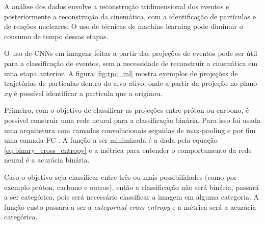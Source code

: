 \documentclass[a4paper,12pt,oneside]{book}
\begin{document}
\begin{appendices}
\par A análise dos dados envolve a reconstrução tridimensional dos eventos e posteriormente a reconstrução da cinemática, com a identificação de partículas e de reações nucleares. O uso de técnicas de machine learning pode diminuir o consumo de tempo dessas etapas.

\par O uso de CNNs em imagens feitas a partir das projeções de eventos pode ser útil para a classificação de eventos, sem a necessidade de reconstruir a cinemática em uma etapa anterior. A figura \ref{fig:tpc_ml} mostra exemplos de projeções de trajetórias de partículas dentro do alvo ativo, onde a partir da projeção no plano $xy$ é possível identificar a partícula que a originou.

\par Primeiro, com o objetivo de classificar as projeções entre próton ou carbono, é possível construir uma rede neural para a classificação binária. Para isso foi usada uma arquitetura com camadas convolucionais seguidas de max-pooling e por fim uma camada FC \cite{KUCHERAML}. A função a ser minimizada é a dada pela equação \ref{eq:binary_cross_entropy} e a métrica para entender o comportamento da rede neural é a acurácia binária.

\par Caso o objetivo seja classificar entre três ou mais possibilidades (como por exemplo próton, carbono e outros), então a classificação não será binária, passará a ser categórica, pois será necessário classificar a imagem em alguma categoria. A função custo passará a ser a \textit{categorical cross-entropy} e a métrica será a acurácia categórica.


\end{appendices}
\end{document}

